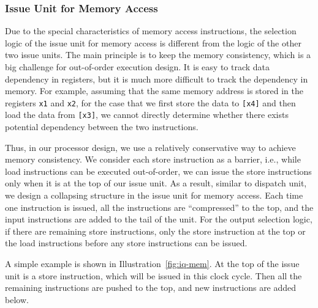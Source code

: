 \subsubsection{Issue Unit for Memory Access} %
Due to the special characteristics of memory access instructions, the selection logic of the issue unit for memory access is different from the logic of the other two issue units. The main principle is to keep the memory consistency, which is a big challenge for out-of-order execution design. It is easy to track data dependency in registers, but it is much more difficult to track the dependency in memory. For example, assuming that the same memory address is stored in the registers \texttt{x1} and \texttt{x2}, for the case that we first store the data to \texttt{[x4]} and then load the data from \texttt{[x3]}, we cannot directly determine whether there exists potential dependency between the two instructions. 

Thus, in our processor design, we use a relatively conservative way to achieve memory consistency. We consider each store instruction as a barrier, i.e., while load instructions can be executed out-of-order, we can issue the store instructions only when it is at the top of our issue unit. As a result, similar to dispatch unit, we design a collapsing structure in the issue unit for memory access. Each time one instruction is issued, all the instructions are ``compressed'' to the top, and the input instructions are added to the tail of the unit. For the output selection logic, if there are remaining store instructions, only the store instruction at the top or the load instructions before any store instructions can be issued.

A simple example is shown in Illustration~\ref{fig:iq-mem}. At the top of the issue unit is a store instruction, which will be issued in this clock cycle. Then all the remaining instructions are pushed to the top, and new instructions are added below.


